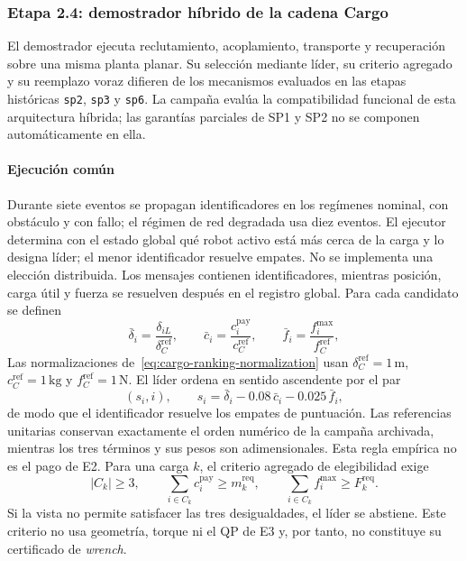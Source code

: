 

\subsubsection{Etapa 2.4: demostrador híbrido de la cadena Cargo}
\label{subsubsec:sp2-cargo-e2e}

El demostrador ejecuta reclutamiento, acoplamiento, transporte y recuperación sobre una misma planta planar. Su selección mediante líder, su criterio agregado y su reemplazo voraz difieren de los mecanismos evaluados en las etapas históricas \texttt{sp2}, \texttt{sp3} y \texttt{sp6}. La campaña evalúa la compatibilidad funcional de esta arquitectura híbrida; las garantías parciales de SP1 y SP2 no se componen automáticamente en ella.

\paragraph{Ejecución común}

Durante siete eventos se propagan identificadores en los regímenes nominal, con obstáculo y con fallo; el régimen de red degradada usa diez eventos. El ejecutor determina con el estado global qué robot activo está más cerca de la carga y lo designa líder; el menor identificador resuelve empates. No se implementa una elección distribuida. Los mensajes contienen identificadores, mientras posición, carga útil y fuerza se resuelven después en el registro global. Para cada candidato se definen
\begin{equation}
 \bar\delta_i=\frac{\delta_{iL}}{\delta_C^{\mathrm{ref}}},\qquad
 \bar c_i=\frac{c_i^{\mathrm{pay}}}{c_C^{\mathrm{ref}}},\qquad
 \bar f_i=\frac{f_i^{\max}}{f_C^{\mathrm{ref}}},
 \label{eq:cargo-ranking-normalization}
\end{equation}
Las normalizaciones de~\eqref{eq:cargo-ranking-normalization} usan $\delta_C^{\mathrm{ref}}=1\,\mathrm{m}$, $c_C^{\mathrm{ref}}=1\,\mathrm{kg}$ y $f_C^{\mathrm{ref}}=1\,\mathrm{N}$. El líder ordena en sentido ascendente por el par
\begin{equation}
 \left(s_i,i\right),\qquad
 s_i=\bar\delta_i-0.08\,\bar c_i-0.025\,\bar f_i,
 \label{eq:cargo-ranking}
\end{equation}
de modo que el identificador resuelve los empates de puntuación. Las referencias unitarias conservan exactamente el orden numérico de la campaña archivada, mientras los tres términos y sus pesos son adimensionales. Esta regla empírica no es el pago de E2. Para una carga $k$, el criterio agregado de elegibilidad exige
\begin{equation}
 |C_k|\geq3,\qquad
 \sum_{i\in C_k}c_i^{\mathrm{pay}}\geq m_k^{\mathrm{req}},\qquad
 \sum_{i\in C_k}f_i^{\max}\geq F_k^{\mathrm{req}}.
 \label{eq:cargo-aggregate-certificate}
\end{equation}
Si la vista no permite satisfacer las tres desigualdades, el líder se abstiene. Este criterio no usa geometría, torque ni el QP de E3 y, por tanto, no constituye su certificado de \emph{wrench}.

